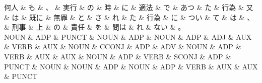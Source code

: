 \documentclass[tikz,border=5pt]{standalone}
\begin{document}
\small
\begin{dependency}[edge unit distance=8.1pt]
    \begin{deptext}[column sep=0.5em]
        何人 \& も \& 、 \& 実行 \& の \& 時 \& に \& 適法 \& で \& あつ \& た \& 行為 \& 又 \& は \& 既に \& 無罪 \& と \& さ \& れ \& た \& 行為 \& に \& つい \& て \& は \& 、 \& 刑事 \& 上 \& の \& 責任 \& を \& 問は \& れ \& ない \& 。\\
        NOUN \& ADP \& PUNCT \& NOUN \& ADP \& NOUN \& ADP \& ADJ \& AUX \& VERB \& AUX \& NOUN \& CCONJ \& ADP \& ADV \& NOUN \& ADP \& VERB \& AUX \& AUX \& NOUN \& ADP \& VERB \& SCONJ \& ADP \& PUNCT \& NOUN \& NOUN \& ADP \& NOUN \& ADP \& VERB \& AUX \& AUX \& PUNCT\\
    \end{deptext}
\end{dependency}
\end{document}
